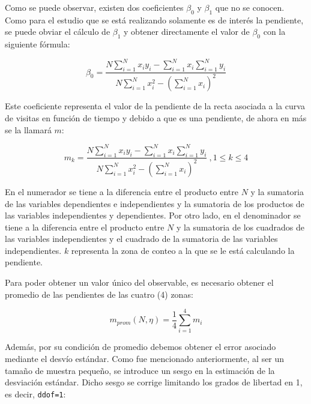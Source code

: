 \documentclass[11pt, a4paper]{article}
\begin{document}
            Como se puede observar, existen dos coeficientes $\beta_0$ y $\beta_1$ que no se conocen.
            Como para el estudio que se está realizando solamente es de interés la pendiente, se puede obviar el cálculo
            de $\beta_1$ y obtener directamente el valor de $\beta_0$ con la siguiente fórmula:

            \begin{equation}
                \beta_0 = \frac{N \sum_{i=1}^N x_i y_i - \sum_{i=1}^N x_i \sum_{i=1}^N y_i }{N \sum_{i=1}^N x_i^2 - \left(\sum_{i=1}^N x_i \right)^2}
            \end{equation}

            Este coeficiente representa el valor de la pendiente de la recta asociada a la curva de visitas en función
            de tiempo y debido a que es una pendiente, de ahora en más se la llamará $m$:

            \begin{equation}
                m_k = \frac{N \sum_{i=1}^N x_i y_i - \sum_{i=1}^N x_i \sum_{i=1}^N y_i }{N \sum_{i=1}^N x_i^2 - \left(\sum_{i=1}^N x_i \right)^2}
                \ , 1 \leq k \leq 4
            \end{equation}

            En el numerador se tiene a la diferencia entre el producto entre $N$ y la sumatoria de las variables dependientes e independientes
            y la sumatoria de los productos de las variables independientes y dependientes.
            Por otro lado, en el denominador se tiene a la diferencia entre el producto entre $N$ y la sumatoria de los
            cuadrados de las variables independientes y el cuadrado de la sumatoria de las variables independientes.
            $k$ representa la zona de conteo a la que se le está calculando la pendiente.

            Para poder obtener un valor único del observable, es necesario obtener el promedio de las pendientes de las cuatro (4) zonas:

            \begin{equation}
                m_{prom}(N,\eta) = \frac{1}{4} \sum_{i=1}^{4} m_i
            \end{equation}

            Además, por su condición de promedio debemos obtener el error asociado mediante el desvío estándar.
            Como fue mencionado anteriormente, al ser un tamaño de muestra pequeño, se introduce un sesgo en la
            estimación de la desviación estándar.
            Dicho sesgo se corrige limitando los grados de libertad en 1, es decir, \texttt{ddof=1}:
\end{document}
